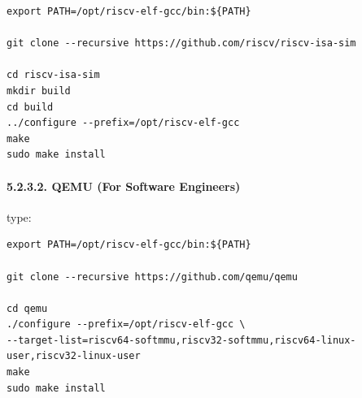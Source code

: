 \documentclass[]{article}
\let\oldparagraph\paragraph
\renewcommand{\paragraph}[1]{\oldparagraph{#1}\mbox{}}
\begin{document}
\begin{verbatim}
export PATH=/opt/riscv-elf-gcc/bin:${PATH}

git clone --recursive https://github.com/riscv/riscv-isa-sim

cd riscv-isa-sim
mkdir build
cd build
../configure --prefix=/opt/riscv-elf-gcc
make
sudo make install
\end{verbatim}

\paragraph{5.2.3.2. QEMU (For Software
Engineers)}\label{qemu-for-software-engineers}

type:

\begin{verbatim}
export PATH=/opt/riscv-elf-gcc/bin:${PATH}

git clone --recursive https://github.com/qemu/qemu

cd qemu
./configure --prefix=/opt/riscv-elf-gcc \
--target-list=riscv64-softmmu,riscv32-softmmu,riscv64-linux-user,riscv32-linux-user
make
sudo make install
\end{verbatim}
\end{document}
